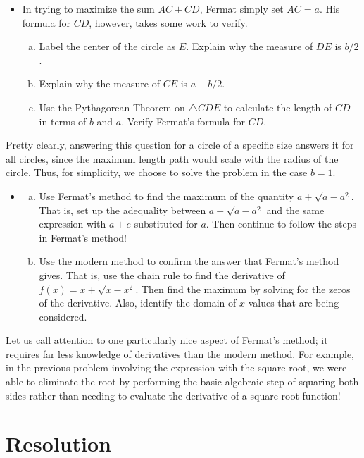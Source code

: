 \documentclass[11pt]{article}
\newcounter{tasknumb}
\newcommand{\tasknumb}[1]{\refstepcounter{tasknumb}\textmd{\textbf{$\fbox{$\fbox{Task \thetasknumb}$}$}}#1}
\newenvironment{task}[1][]%
 {\begin{itemize}
 \item[\tasknumb{#1}]  }
{
    \end{itemize}    }%
\begin{document}
\begin{task}
    In trying to maximize the sum $AC+CD$, Fermat simply set $AC=a$.  His formula for $CD$, however, takes some work to verify.  
    \begin{enumerate}[(a)]
        \item Label the center of the circle as $E$.  Explain why the measure of $DE$ is $b/2$.
        \item Explain why the measure of $CE$ is $a-b/2.$
        \item Use the Pythagorean Theorem on $\triangle CDE$ to calculate the length of $CD$ in terms of $b$ and $a$.  Verify Fermat's formula for $CD$.
    \end{enumerate}
\end{task}

Pretty clearly, answering this question for a circle of a specific size answers it for all circles, since the maximum length path would scale with the radius of the circle.  Thus, for simplicity, we choose to solve the problem in the case $b=1.$

\begin{task}
\begin{enumerate}[(a)]
\item Use Fermat's method to find the maximum of the quantity $a+\sqrt{a-a^2}.$  That is, set up the adequality between $a+\sqrt{a-a^2}$ and the same expression with $a+e$ substituted for $a$.  Then continue to follow the steps in Fermat's method!

\item Use the modern method to confirm the answer that Fermat's method gives.  That is, use the chain rule to find the derivative of $f(x)=x+\sqrt{x-x^2}$. Then find the maximum by solving for the zeros of the derivative.  Also, identify the domain of $x$-values that are being considered.

\end{enumerate}
\end{task}

Let us call attention to one particularly nice aspect of Fermat's method; it requires far less knowledge of derivatives than the modern method.  For example, in the previous problem involving the expression with the square root, we were able to eliminate the root by performing the basic algebraic step of squaring both sides rather than needing to evaluate the derivative of a square root function!

\section{Resolution}
\end{document}
